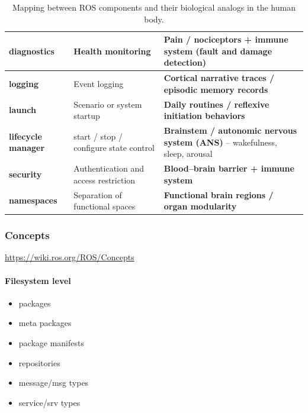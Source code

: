\documentclass{book}
\begin{document}
\begin{table}[h!]
{\begin{tabular}{|>{\raggedright\arraybackslash}p{3cm}|>{\raggedright\arraybackslash}p{4cm}|>{\raggedright\arraybackslash}p{8.5cm}|}
                \hline
                \textbf{diagnostics}                & Health monitoring                      & \textbf{Pain / nociceptors + immune system} (fault and damage detection)                                            \\
                \hline
                \textbf{logging}                    & Event logging                          & \textbf{Cortical narrative traces / episodic memory records}                                                        \\
                \hline
                \textbf{launch}                     & Scenario or system startup             & \textbf{Daily routines / reflexive initiation behaviors}                                                            \\
                \hline
                \textbf{lifecycle manager}          & start / stop / configure state control & \textbf{Brainstem / autonomic nervous system (ANS)} – wakefulness, sleep, arousal                                   \\
                \hline
                \textbf{security}                   & Authentication and access restriction  & \textbf{Blood–brain barrier + immune system}                                                                        \\
                \hline
                \textbf{namespaces}                 & Separation of functional spaces        & \textbf{Functional brain regions / organ modularity}                                                                \\
                \hline
            \end{tabular}
        }
        \caption{Mapping between ROS components and their biological analogs in the human body.}
        \label{tab:ros_human_mapping}
    \end{table}
\subsubsection{Concepts}
\url{https://wiki.ros.org/ROS/Concepts}
    \paragraph{Filesystem level}
        \begin{itemize}
            \item packages
            \item meta packages
            \item package manifests
            \item repositories
            \item message/msg types
            \item service/srv types
        \end{itemize}
\end{document}
